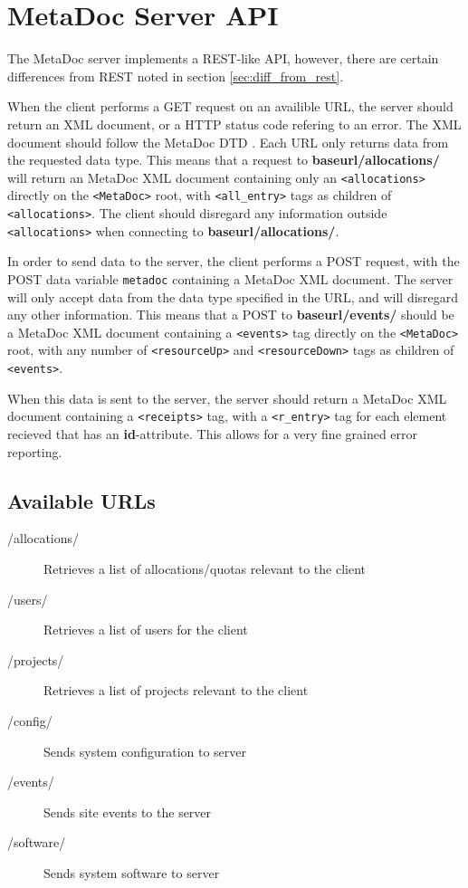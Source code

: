 \newpage
\section{MetaDoc Server API}
\label{sec:server_api}

The MetaDoc server implements a REST-like API, however, there are certain
differences from REST noted in section \ref{sec:diff_from_rest}.

When the client performs a GET request on an availible URL, the server should 
return an XML document, or a HTTP status code refering to an error. 
The XML document should follow the MetaDoc DTD \cite{metadoc_dtd}. Each URL
only returns data from the requested data type. This means that a request to
\textbf{baseurl/allocations/} will return an MetaDoc XML document containing
only an \texttt{<allocations>} directly on the \texttt{<MetaDoc>} root, with
\texttt{<all\_entry>} tags as children of \texttt{<allocations>}. The client
should disregard any information outside \texttt{<allocations>} when connecting
to \textbf{baseurl/allocations/}. 

In order to send data to the server, the client performs a POST request, with
the POST data variable \texttt{metadoc} containing a MetaDoc XML document. The
server will only accept data from the data type specified in the URL, and will
disregard any other information. This means that a POST to
\textbf{baseurl/events/} should be a MetaDoc XML document containing a 
\texttt{<events>} tag directly on the \texttt{<MetaDoc>} root, with any number
of \texttt{<resourceUp>} and \texttt{<resourceDown>} tags as children of
\texttt{<events>}. 

When this data is sent to the server, the server should return a MetaDoc XML
document containing a \texttt{<receipts>} tag, with a \texttt{<r\_entry>} tag
for each element recieved that has an \textbf{id}-attribute. This allows for a
very fine grained error reporting.

\subsection{Available URLs}

\begin{description}
    \item[/allocations/] Retrieves a list of allocations/quotas relevant
        to the client
    \item[/users/] Retrieves a list of users for the client
    \item[/projects/] Retrieves a list of projects relevant to the
        client
    \item[/config/] Sends system configuration to server
    \item[/events/] Sends site events to the server
    \item[/software/] Sends system software to server
\end{description}


